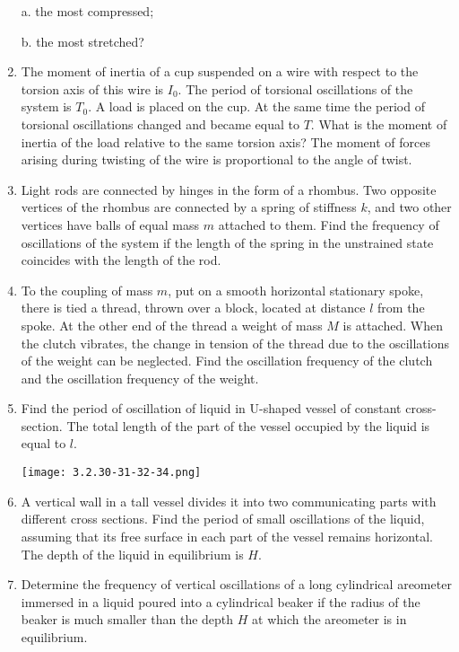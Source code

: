 \documentclass{article}
\begin{document}
\begin{enumerate}[label=3.2.\arabic*]
a. the most compressed; 

b. the most stretched?

\item The moment of inertia of a cup suspended on a wire with respect to the torsion axis of this wire is $I_0$. The period of torsional oscillations of the system is $T_0$. A load is placed on the cup. At the same time the period of torsional oscillations changed and became equal to $T$. What is the moment of inertia of the load relative to the same torsion axis? The moment of forces arising during twisting of the wire is proportional to the angle of twist.

\item Light rods are connected by hinges in the form of a rhombus. Two opposite vertices of the rhombus are connected by a spring of stiffness $k$, and two other vertices have balls of equal mass $m$ attached to them. Find the frequency of oscillations of the system if the length of the spring in the unstrained state coincides with the length of the rod.



\item To the coupling of mass $m$, put on a smooth horizontal stationary spoke, there is tied a thread, thrown over a block, located at distance $l$ from the spoke. At the other end of the thread a weight of mass $M$ is attached. When the clutch vibrates, the change in tension of the thread due to the oscillations of the weight can be neglected. Find the oscillation frequency of the clutch and the oscillation frequency of the weight.

\item Find the period of oscillation of liquid in U-shaped vessel of constant cross-section. The total length of the part of the vessel occupied by the liquid is equal to $l$.

\begin{center}
    \texttt{[image: 3.2.30-31-32-34.png]}
\end{center}

\item A vertical wall in a tall vessel divides it into two communicating parts with different cross sections. Find the period of small oscillations of the liquid, assuming that its free surface in each part of the vessel remains horizontal. The depth of the liquid in equilibrium is $H$.

\item Determine the frequency of vertical oscillations of a long cylindrical areometer immersed in a liquid poured into a cylindrical beaker if the radius of the beaker is much smaller than the depth $H$ at which the areometer is in equilibrium.


\end{enumerate}
\end{document}
